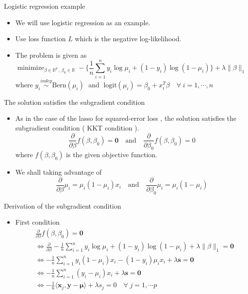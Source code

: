 \documentclass[11pt]{beamer}
\newcommand{\R}{\mathbb{R}}
\begin{document}
\begin{frame}{Logistic regression example}
    \begin{itemize}
        \item We will use logistic regression as an example.
        \item Use loss function $L$ which is the negative log-likelihood.
        \item The problem is given as 
        $$\text{minimize}_{\beta\in \R^p\, ,\, \beta_0\in \R} \; -\Big\{\frac 1 n \sum_{i=1}^n y_i\log \mu_i +(1-y_i)\log(1-\mu_i)\Big\} + \lambda \|\beta\|_1$$
        where $y_i\overset{indep}{\sim} \text{Bern}(\mu_i)\;$ and $\;\text{logit}(\mu_i)=\beta_0+x_i^T\beta\quad \forall \; i=1, \cdots, n$
    \end{itemize}
\end{frame}

\begin{frame}{The solution satisfies the subgradient condition}
    \begin{itemize}
        \item As in the case of the lasso for squared-error loss , the solution satisfies the subgradient condition ( KKT condition ).
        $$\frac{\partial}{\partial \beta}f(\beta, \beta_0)=\mathbf{0} \quad \text{and} \quad \frac{\partial}{\partial \beta_0}f(\beta, \beta_0)=0$$ where $f(\beta, \beta_0)$ is the given objective function.
        \item We shall taking advantage of 
        $$\frac{\partial}{\partial\beta}\mu_i = \mu_i(1-\mu_i)x_i \quad \text{and} \quad \frac{\partial}{\partial\beta_0}\mu_i = \mu_i(1-\mu_i)$$
    \end{itemize}
\end{frame}

\begin{frame}{Derivation of the subgradient condition}
    \begin{itemize}
        \item First condition
        \begin{align*}
            &\frac{\partial}{\partial \beta}f(\beta, \beta_0)=\mathbf{0} \\
            &\Leftrightarrow \frac{\partial}{\partial \beta} -\frac 1 n \sum_{i=1}^n y_i\log \mu_i +(1-y_i)\log(1-\mu_i)+\lambda \|\beta\|_1 =\mathbf{0} \\ 
            &\Leftrightarrow -\frac 1n \sum_{i=1}^n y_i(1-\mu_i)x_i - (1-y_i)\mu_i x_i + \lambda \mathbf{s} =\mathbf{0}\\
            &\Leftrightarrow  -\frac 1n \sum_{i=1}^n (y_i-\mu_i)x_i  + \lambda \mathbf{s} =\mathbf{0}\\
            &\Leftrightarrow -\frac 1n \langle \mathbf{x}_j, \mathbf{y}-\mathbf{\mu}\rangle + \lambda s_j=0\quad \forall \; j=1, \cdots p
        \end{align*}
    \end{itemize}
\end{frame}
\end{document}
